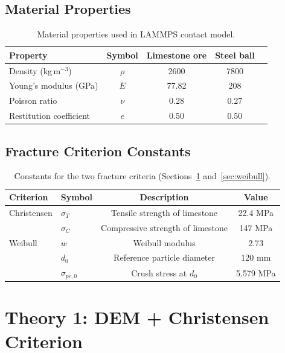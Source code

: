 \documentclass{article}
\begin{document}
\subsection{Material Properties}

\begin{table}[h!]
\centering
\begin{tabular}{@{}lcccc@{}}
\toprule
Property & Symbol & Limestone ore & Steel ball \\
\midrule
Density (kg\,m$^{-3}$)   & $\rho$   & 2600    & 7800 \\
Young's modulus (GPa)     & $E$      & 77.82   & 208  \\
Poisson ratio             & $\nu$    & 0.28    & 0.27 \\
Restitution coefficient   & $e$      & 0.50    & 0.50 \\
\bottomrule
\end{tabular}
\caption{Material properties used in LAMMPS contact model.}
\end{table}

\subsection{Fracture Criterion Constants}

\begin{table}[h!]
\centering
\begin{tabular}{@{}llcc@{}}
\toprule
Criterion & Symbol & Description & Value \\
\midrule
Christensen & $\sigma_T$ & Tensile strength of limestone  & 22.4 MPa \\
            & $\sigma_C$ & Compressive strength of limestone & 147 MPa \\[4pt]
Weibull     & $w$        & Weibull modulus                & 2.73 \\
            & $d_0$      & Reference particle diameter    & 120 mm \\
            & $\sigma_{pc,0}$ & Crush stress at $d_0$     & 5.579 MPa \\
\bottomrule
\end{tabular}
\caption{Constants for the two fracture criteria (Sections~\ref{sec:christensen} and~\ref{sec:weibull}).}
\end{table}

\section{Theory 1: DEM + Christensen Criterion}
\label{sec:christensen}
\end{document}
